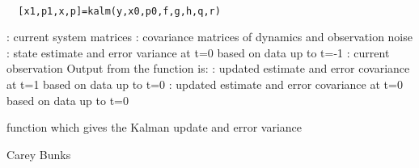 
\begin{mandesc}
   \\ %
\end{mandesc}
\begin{calling_sequence}
\begin{verbatim}
  [x1,p1,x,p]=kalm(y,x0,p0,f,g,h,q,r)  
\end{verbatim}
\end{calling_sequence}
\begin{parameters}
  \begin{varlist}
    : current system matrices
    : covariance matrices of dynamics and observation noise
    : state estimate and error variance at t=0 based on data up to t=-1
    : current observation Output from the function is:
    : updated estimate and error covariance at t=1 based on data up to t=0
    : updated estimate and error covariance at t=0  based on data up to t=0
  \end{varlist}
\end{parameters}
\begin{mandescription}
  function which gives the Kalman update and error variance
\end{mandescription}
\begin{authors}
  Carey Bunks
\end{authors}
